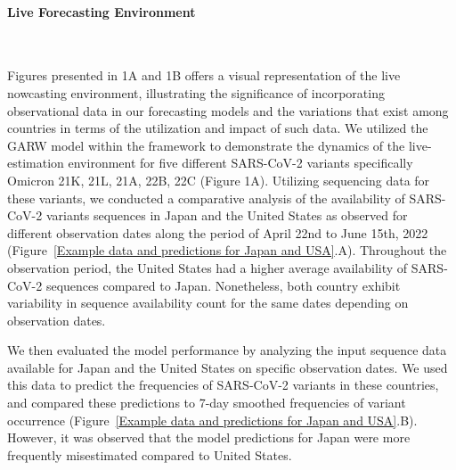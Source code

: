 \documentclass[11pt,oneside,letterpaper]{article}
\begin{document}

\paragraph{Live Forecasting Environment}\

Figures presented in 1A and 1B offers a visual representation of the live nowcasting environment, illustrating the significance of incorporating observational data in our forecasting models and the variations that exist among countries in terms of the utilization and impact of such data.
We utilized the GARW model within the framework to demonstrate the dynamics of the live-estimation environment for five different SARS-CoV-2 variants specifically Omicron 21K, 21L, 21A, 22B, 22C (Figure 1A).
Utilizing sequencing data for these variants, we conducted a comparative analysis of the availability of SARS-CoV-2 variants sequences in Japan and the United States as observed for different observation dates along the period of April 22nd to June 15th, 2022 (Figure~\ref{Example data and predictions for Japan and USA}.A).
Throughout the observation period, the United States had a higher average availability of SARS-CoV-2 sequences compared to Japan. 
Nonetheless, both country exhibit variability in sequence availability count for the same dates depending on observation dates. 


We then evaluated the model performance by analyzing the input sequence data available for Japan and the United States on specific observation dates.
We used this data to predict the frequencies of SARS-CoV-2 variants in these countries, and compared these predictions to 7-day smoothed frequencies of variant occurrence (Figure~\ref{Example data and predictions for Japan and USA}.B).
However, it was observed that the model predictions for Japan were more frequently misestimated compared to United States.
\end{document}
